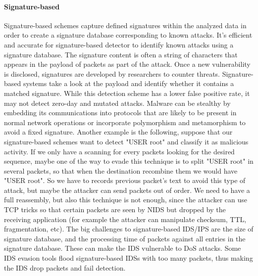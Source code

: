 \documentclass[11pt]{article}
\begin{document}
\paragraph{Signature-based} Signature-based schemes capture defined signatures within the analyzed data in order to create a signature database corresponding to known attacks. It's efficient and accurate for signature-based detector to identify known attacks using a signature database. The signature content is often a string of characters that appears in the payload of packets as part of the attack. Once a new vulnerability is disclosed, signatures are developed by researchers to counter threats. Signature-based systems take a look at the payload and identify whether it contains a matched signature. While this detection scheme has a lower false positive rate, it may not detect zero-day and mutated attacks. Malware can be stealthy by embedding its communications into protocols that are likely to be present in normal network operations or incorporate polymorphism and metamorphism to avoid a fixed signature. Another example is the following, suppose that our signature-based schemes want to detect "USER root" and classify it as malicious activity. If we only have a scanning for every packets looking for the desired sequence, maybe one of the way to evade this technique is to split "USER root" in several packets, so that when the destination recombine them we would have "USER root". So we have to records previous packet's text to avoid this type of attack, but maybe the attacker can send packets out of order. We need to have a full reassembly, but also this technique is not enough, since the attacker can use TCP tricks so that certain packets are seen by NIDS but dropped by the receiving application (for example the attacker can manipulate checksum, TTL, fragmentation, etc). The big challenges to signature-based IDS/IPS are the size of signature database, and the processing time of packets against all entries in the signature database. These can make the IDS vulnerable to DoS attacks. Some IDS evasion tools flood signature-based IDSs with too many packets, thus making the IDS drop packets and fail detection.
\end{document}
